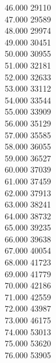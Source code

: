 { 46.000	29110 \\
 47.000	29589 \\
 48.000	29974 \\
 49.000	30451 \\
 50.000	30955 \\
 51.000	32181 \\
 52.000	32633 \\
 53.000	33112 \\
 54.000	33544 \\
 55.000	33909 \\
 56.000	35129 \\
 57.000	35585 \\
 58.000	36055 \\
 59.000	36527 \\
 60.000	37039 \\
 61.000	37459 \\
 62.000	37913 \\
 63.000	38241 \\
 64.000	38732 \\
 65.000	39235 \\
 66.000	39638 \\
 67.000	40054 \\
 68.000	41723 \\
 69.000	41779 \\
 70.000	42186 \\
 71.000	42559 \\
 72.000	43987 \\
 73.000	46175 \\
 74.000	53013 \\
 75.000	53620 \\
 76.000	53905 \\
}

